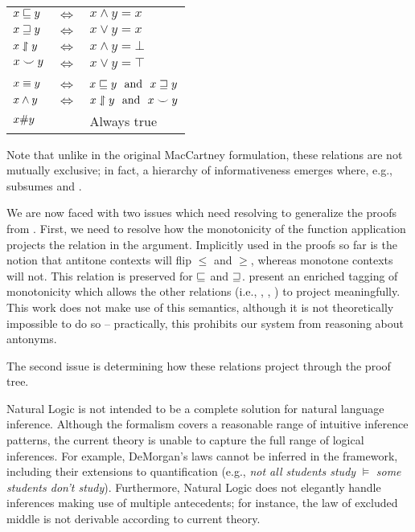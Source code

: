 \begin{center}
\begin{tabular}{lcl}
  $x \sqsubseteq y$ & $\Leftrightarrow$ & $x \land y = x$ \\
  $x \sqsupseteq y$ & $\Leftrightarrow$ & $x \lor y = x$ \\
  $x \downharpoonleft\hspace{-0.30em}\upharpoonright y$ & $\Leftrightarrow$ & $x \land y = \bot$ \\
  $x \smile y$ & $\Leftrightarrow$ & $x \lor y = \top$ \\
  \vspace{-0.5em} & & \\
  $x \equiv y$ & $\Leftrightarrow$ & $x \sqsubseteq y~~\textrm{and}~~x \sqsupseteq y$ \\
  $x \wedge y$ & $\Leftrightarrow$ & $x \downharpoonleft\hspace{-0.30em}\upharpoonright y~~\textrm{and}~~x \smile y$ \\
  $x \# y$ & & Always true
\end{tabular}
\end{center}

Note that unlike in the original MacCartney formulation, these relations
  are not mutually exclusive; in fact, a hierarchy of informativeness
  emerges where, e.g., \negate subsumes \alternate and \cover.

We are now faced with two issues which need resolving to generalize
  the proofs from .
First, we need to resolve how the monotonicity of the function application
  projects the relation in the argument.
Implicitly used in the proofs so far is the notion that antitone contexts
  will flip $\leq$ and $\geq$, whereas monotone contexts will not.
This relation is preserved for $\sqsubseteq$ and $\sqsupseteq$.
 present an enriched tagging of 
  monotonicity which allows the other relations (i.e.,
  \negate, \alternate, \cover) to project meaningfully.
This work does not make use of this semantics, although it is not
  theoretically impossible to do so -- practically, this prohibits
  our system from reasoning about antonyms.

The second issue is determining how these relations project through
  the proof tree.

Natural Logic is not intended to be a complete solution for natural
  language inference.
Although the formalism covers a reasonable range of intuitive inference
  patterns, the current theory is unable to capture the full range
  of logical inferences.
For example, DeMorgan's laws 
  cannot be inferred in the framework,
  including their extensions to quantification
  (e.g., \textit{not all students study} $\models$ \textit{some students don't study}).
Furthermore, Natural Logic does not elegantly handle inferences
  making use of multiple antecedents; for instance, the law of
  excluded middle is not derivable according to current theory.

